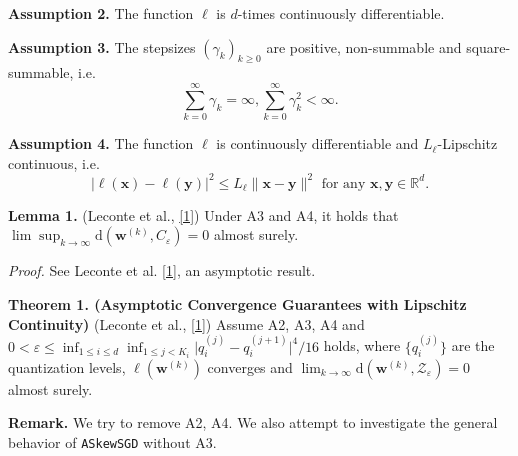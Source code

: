 \documentclass[10pt,a4paper]{article}
\begin{document}
\textbf{Assumption 2.} The function $\ell$ is $d$-times continuously differentiable.

\textbf{Assumption 3.} The stepsizes $(\gamma_k)_{k\geq 0}$ are positive, non-summable and square-summable, i.e. \[\sum\limits_{k=0}^\infty \gamma_k=\infty, \sum\limits_{k=0}^\infty \gamma_k^2<\infty.\]

\textbf{Assumption 4.} The function $\ell$ is continuously differentiable and $L_\ell$-Lipschitz continuous, i.e. \[| \ell(\mathbf{x})- \ell(\mathbf{y})|^2\leq L_\ell \lVert \mathbf{x}-\mathbf{y}\rVert^2\text{ for any }\mathbf{x}, \mathbf{y}\in\mathbb{R}^d.\]

\textbf{Lemma 1.} (Leconte et al., \ref{1}) Under A3 and A4, it holds that $\lim\sup_{k\to\infty} \text{d}(\mathbf{w}^{(k)}, C_\varepsilon)=0$ almost surely.

\textit{Proof.} See Leconte et al. \ref{1}, an asymptotic result.

\textbf{Theorem 1. (Asymptotic Convergence Guarantees with Lipschitz Continuity)} (Leconte et al., \ref{1}) Assume A2, A3, A4 and $0<\varepsilon\leq \inf_{1\leq i\leq d}\inf_{1\leq j< K_i} \lvert q^{(j)}_i - q^{(j+1)}_i\rvert^4/16$ holds, where $\{q^{(j)}_i\}$ are the quantization levels, $\ell(\mathbf{w}^{(k)})$ converges and $\lim_{k\to\infty} \text{d}(\mathbf{w}^{(k)}, \mathcal{Z}_\varepsilon)=0$ almost surely.

\textbf{Remark.} We try to remove A2, A4. We also attempt to investigate the general behavior of \texttt{ASkewSGD} without A3.





\end{document}
